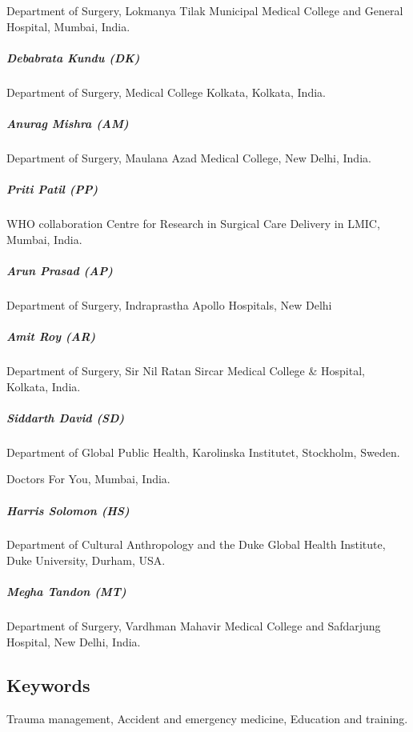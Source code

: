 \documentclass[
]{article}
\begin{document}
Department of Surgery, Lokmanya Tilak Municipal Medical College and General Hospital, Mumbai, India.

\hypertarget{debabrata-kundu-dk}{%
\subparagraph{Debabrata Kundu (DK)}\label{debabrata-kundu-dk}}

Department of Surgery, Medical College Kolkata, Kolkata, India.

\hypertarget{anurag-mishra-am}{%
\subparagraph{Anurag Mishra (AM)}\label{anurag-mishra-am}}

Department of Surgery, Maulana Azad Medical College, New Delhi, India.

\hypertarget{priti-patil-pp}{%
\subparagraph{Priti Patil (PP)}\label{priti-patil-pp}}

WHO collaboration Centre for Research in Surgical Care Delivery in LMIC, Mumbai, India.

\hypertarget{arun-prasad-ap}{%
\subparagraph{Arun Prasad (AP)}\label{arun-prasad-ap}}

Department of Surgery, Indraprastha Apollo Hospitals, New Delhi

\hypertarget{amit-roy-ar}{%
\subparagraph{Amit Roy (AR)}\label{amit-roy-ar}}

Department of Surgery, Sir Nil Ratan Sircar Medical College \& Hospital, Kolkata, India.

\hypertarget{siddarth-david-sd}{%
\subparagraph{Siddarth David (SD)}\label{siddarth-david-sd}}

Department of Global Public Health, Karolinska Institutet, Stockholm, Sweden.

Doctors For You, Mumbai, India.

\hypertarget{harris-solomon-hs}{%
\subparagraph{Harris Solomon (HS)}\label{harris-solomon-hs}}

Department of Cultural Anthropology and the Duke Global Health Institute, Duke University, Durham, USA.

\hypertarget{megha-tandon-mt}{%
\subparagraph{Megha Tandon (MT)}\label{megha-tandon-mt}}

Department of Surgery, Vardhman Mahavir Medical College and Safdarjung Hospital, New Delhi, India.

\hypertarget{keywords}{%
\subsection{Keywords}\label{keywords}}

Trauma management, Accident and emergency medicine, Education and training.
\end{document}
